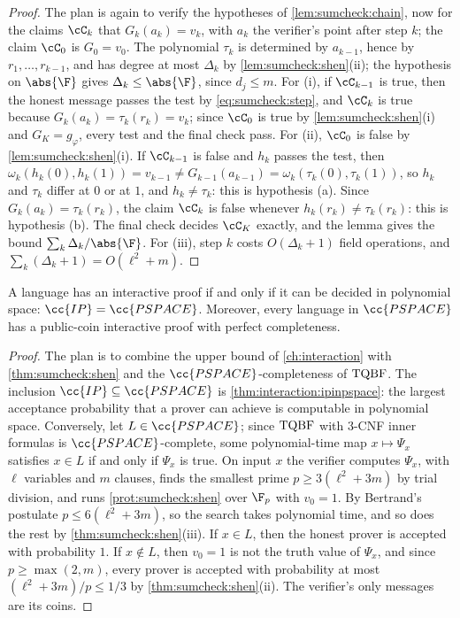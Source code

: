 \begin{refsection}
\begin{proof}
The plan is again to verify the hypotheses of \cref{lem:sumcheck:chain}, now for the claims $\cC_k$ that $G_k(a_k)=v_k$, with $a_k$ the verifier's point after step $k$; the claim $\cC_0$ is $G_0=v_0$. The polynomial $\tau_k$ is determined by $a_{k-1}$, hence by $r_1,\dots,r_{k-1}$, and has degree at most $\Delta_k$ by \cref{lem:sumcheck:shen}(ii); the hypothesis on $\abs{\F}$ gives $\Delta_k\le\abs{\F}$, since $d_j\le m$. For (i), if $\cC_{k-1}$ is true, then the honest message passes the test by \eqref{eq:sumcheck:step}, and $\cC_k$ is true because $G_k(a_k)=\tau_k(r_k)=v_k$; since $\cC_0$ is true by \cref{lem:sumcheck:shen}(i) and $G_K=g_\varphi$, every test and the final check pass. For (ii), $\cC_0$ is false by \cref{lem:sumcheck:shen}(i). If $\cC_{k-1}$ is false and $h_k$ passes the test, then $\omega_k(h_k(0),h_k(1))=v_{k-1}\ne G_{k-1}(a_{k-1})=\omega_k(\tau_k(0),\tau_k(1))$, so $h_k$ and $\tau_k$ differ at $0$ or at $1$, and $h_k\ne\tau_k$: this is hypothesis (a). Since $G_k(a_k)=\tau_k(r_k)$, the claim $\cC_k$ is false whenever $h_k(r_k)\ne\tau_k(r_k)$: this is hypothesis (b). The final check decides $\cC_K$ exactly, and the lemma gives the bound $\sum_k\Delta_k/\abs{\F}$. For (iii), step $k$ costs $O(\Delta_k+1)$ field operations, and $\sum_k(\Delta_k+1)=O(\ell^2+m)$.
\end{proof}

\begin{theorem}[$\cc{IP}=\cc{PSPACE}$; \textcite{LundEtAl1992}, \textcite{Shamir1992}]\label{thm:sumcheck:ippspace}
A language has an interactive proof if and only if it can be decided in polynomial space: $\cc{IP}=\cc{PSPACE}$. Moreover, every language in $\cc{PSPACE}$ has a public-coin interactive proof with perfect completeness.
\end{theorem}

\begin{proof}
The plan is to combine the upper bound of \cref{ch:interaction} with \cref{thm:sumcheck:shen} and the $\cc{PSPACE}$-completeness of $\mathrm{TQBF}$. The inclusion $\cc{IP}\subseteq\cc{PSPACE}$ is \cref{thm:interaction:ipinpspace}: the largest acceptance probability that a prover can achieve is computable in polynomial space. Conversely, let $L\in\cc{PSPACE}$; since $\mathrm{TQBF}$ with 3-CNF inner formulas is $\cc{PSPACE}$-complete, some polynomial-time map $x\mapsto\Psi_x$ satisfies $x\in L$ if and only if $\Psi_x$ is true. On input $x$ the verifier computes $\Psi_x$, with $\ell$ variables and $m$ clauses, finds the smallest prime $p\ge3(\ell^2+3m)$ by trial division, and runs \cref{prot:sumcheck:shen} over $\F_p$ with $v_0=1$. By Bertrand's postulate $p\le6(\ell^2+3m)$, so the search takes polynomial time, and so does the rest by \cref{thm:sumcheck:shen}(iii). If $x\in L$, then the honest prover is accepted with probability $1$. If $x\notin L$, then $v_0=1$ is not the truth value of $\Psi_x$, and since $p\ge\max(2,m)$, every prover is accepted with probability at most $(\ell^2+3m)/p\le1/3$ by \cref{thm:sumcheck:shen}(ii). The verifier's only messages are its coins.
\end{proof}


\end{refsection}
